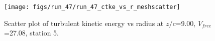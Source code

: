 \begin{figure}[H]
\centering
\texttt{[image: figs/run\_47/run\_47\_ctke\_vs\_r\_meshscatter]}
\caption{Scatter plot of turbulent kinetic energy vs radius at $z/c$=9.00, $V_{free}$=27.08, station 5.}
\label{fig:run_47_ctke_vs_r_meshscatter}
\end{figure}



